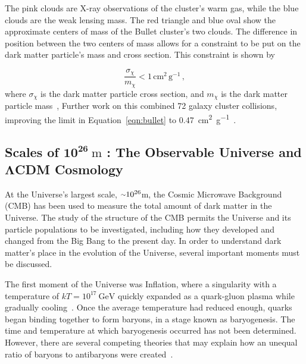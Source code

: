 The pink clouds are X-ray observations of the cluster's warm gas, while the blue clouds are the weak lensing mass.
The red triangle and blue oval show the approximate centers of mass of the Bullet cluster's two clouds.
The difference in position between the two centers of mass allows for a constraint to be put on the dark matter particle's mass and cross section.
This constraint is shown by

\begin{equation}\label{eqn:bullet}
  \frac{\sigma_{\chi}}{m_{\chi}} < 1 \, \textrm{cm}^2 \, \textrm{g}^{-1} \,,
\end{equation}
where $\sigma_{\chi}$ is the dark matter particle cross section, and $m_{\chi}$ is the dark matter particle mass~\cite{bullet_cluster,bullet_cluster2},
Further work on this combined 72 galaxy cluster collisions, improving the limit in Equation~\ref{eqn:bullet} to \SI{0.47}{cm^2 g^{-1}}~\cite{cluster_72}.


\subsection[Scales of $10^{26}\:\text{m}$ : The Observable Universe and $\Lambda$CDM Cosmology]{Scales of $\mathbf{10^{26}}\:\text{m}$ : The Observable Universe and $\mathbf{\Lambda}$CDM Cosmology}\label{dm_universe}
At the Universe's largest scale, $\nicetilde 10^{26}$m, the Cosmic Microwave Background (CMB) has been used to measure the total amount of dark matter in the Universe.
The study of the structure of the CMB permits the Universe and its particle populations to be investigated, including how they developed and changed from the Big Bang to the present day.
In order to understand dark matter's place in the evolution of the Universe, several important moments must be discussed.

The first moment of the Universe was Inflation, where a singularity with a temperature of $kT=10^{17}\:\textrm{GeV}$ quickly expanded as a quark-gluon plasma while gradually cooling~\cite{inflation0,inflation1,inflation2,inflation3}.
Once the average temperature had reduced enough, quarks began binding together to form baryons, in a stage known as baryogenesis.
The time and temperature at which baryogenesis occurred has not been determined.
However, there are several competing theories that may explain how an unequal ratio of baryons to antibaryons were created~\cite{baryogenesis1,baryogenesis2}.

